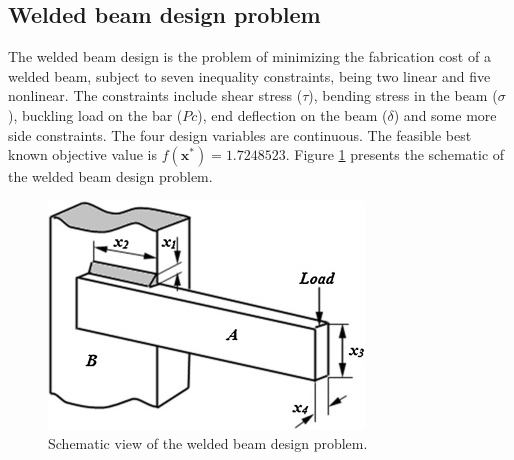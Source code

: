 
\subsection*{Welded beam design problem}


The welded beam design \citep{WB} is the problem of minimizing the fabrication cost of a welded beam, subject to seven inequality constraints, being two linear and five nonlinear. The constraints include shear stress ($\tau$), bending stress in the beam ($\sigma$), buckling load on the bar ($Pc$), end deflection on the beam ($\delta$) and some more side constraints. The four design variables are continuous. The feasible best known objective value is $f(\bm{x}^*) = 1.7248523$. Figure \ref{fig:WB} presents the schematic of the welded beam design problem. \\


\begin{figure}[h]
    \begin{center}
    \includegraphics[scale=0.7]{Imgs/WB.jpg}
    \end{center}
    \captionsetup{justification=centering}
    \caption{Schematic view of the welded beam design problem.}\label{fig:WB}
\end{figure}


